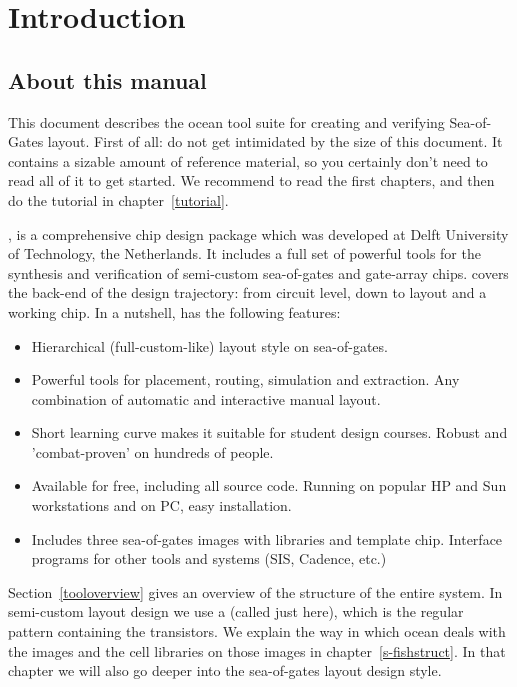 
\chapter{Introduction}
\section{About this manual}
This document describes the {\sc ocean} tool suite for creating and verifying
Sea-of-Gates layout. First of all: do not get intimidated by the size of this
document. It contains a sizable amount of reference material, so you certainly
don't need to read all of it to get started. We recommend to read the first
chapters, and then do the tutorial in chapter~\ref{tutorial}.

, is a comprehensive chip design
package which was developed at Delft University of Technology, the Netherlands.
It includes a full set of powerful tools for the synthesis and verification of
semi-custom sea-of-gates and gate-array chips.   covers the back-end
of the design trajectory: from circuit level, down to layout and a working
chip.  In a nutshell,  has the following features:
\begin{itemize}
\item
Hierarchical (full-custom-like) layout style on sea-of-gates.
\item
Powerful tools for placement, routing, simulation and extraction.
Any combination of automatic and interactive manual layout.
\item
Short learning curve makes it suitable for student design courses.
Robust and 'combat-proven' on hundreds of people.
\item
Available for free, including all source code.
Running on popular HP and Sun workstations and on PC, easy installation.
\item
Includes three sea-of-gates images with libraries and template chip.
Interface programs for other tools and systems (SIS, Cadence, etc.)
\end{itemize}

Section~\ref{tooloverview} gives an overview of the structure of the entire
system. In semi-custom layout design we use a  (called just
 here), which is the regular pattern containing the transistors. We
explain the way in which {\sc ocean} deals with the images and the cell
libraries on those images in chapter~\ref{s-fishstruct}. In that
chapter we will also go deeper into the sea-of-gates layout design style.

